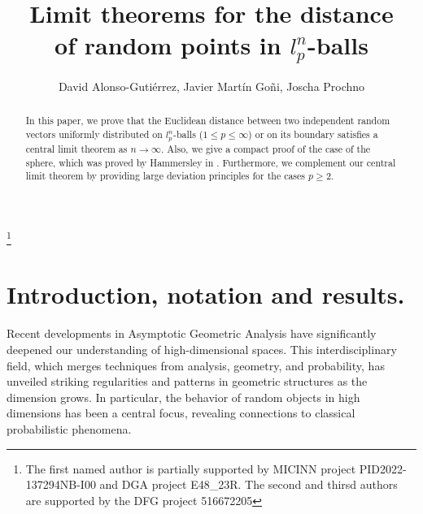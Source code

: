 \documentclass[10pt]{amsart}
\newcounter{theor}
\numberwithin{equation}{section}
\begin{document}
\title[CLT for distance]{Limit theorems for the distance \\of random points in $l_p^n$-balls}
\author{David Alonso-Guti\'errez, Javier Mart\'in Go\~ni, Joscha Prochno}
\address{University of Passau. Faculty of Computer Sciences and Mathematics. Innstrasse 41, 94032 Passau, Germany.}
\thanks{The first named author is partially supported by MICINN project PID2022-137294NB-I00 and DGA project E48\_23R. The second and thirsd authors are supported by the DFG project 516672205}
\maketitle

\begin{abstract}
In this paper, we prove that the Euclidean distance between two independent random vectors uniformly distributed on $l_p^n$-balls ($1 \leq p \leq \infty$) or on its boundary satisfies a central limit theorem as $n\to\infty$. Also, we give a compact proof of the case of the sphere, which was proved by Hammersley in \cite{H}. Furthermore, we complement our central limit theorem by providing large deviation principles for the cases $p \geq 2$.
\end{abstract}





 \section{Introduction, notation and results.}
 \label{section1}

Recent developments in Asymptotic Geometric Analysis have significantly deepened our understanding of high-dimensional spaces. This interdisciplinary field, which merges techniques from analysis, geometry, and probability, has unveiled striking regularities and patterns in geometric structures as the dimension grows. In particular, the behavior of random objects in high dimensions has been a central focus, revealing connections to classical probabilistic phenomena.
\end{document}
